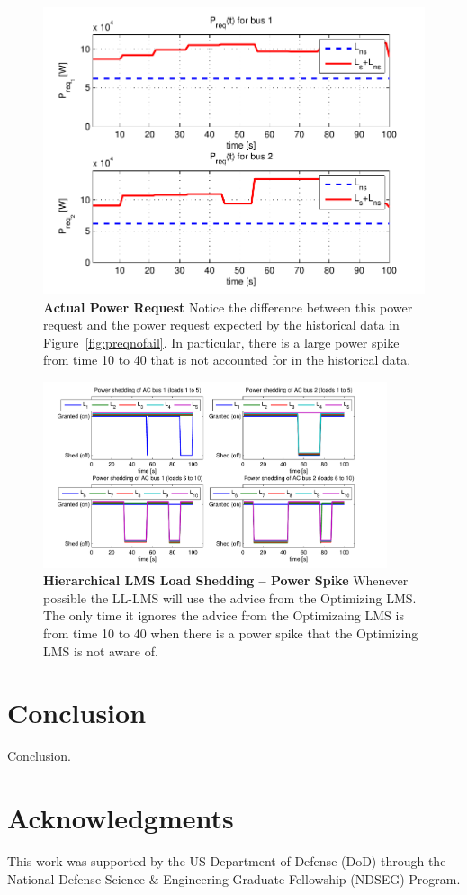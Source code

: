 \documentclass{acm_proc_article-sp}
\begin{document}
\begin{figure}[htb]
  \centering
  \includegraphics[width=0.9\columnwidth]{figures/preqpwrspike}
  \caption{\textbf{Actual Power Request} Notice the difference between this power
  request and the power request expected by the historical data in 
  Figure~\ref{fig:preqnofail}. In particular, there is a large power spike from time 10
  to 40 that is not accounted for in the historical data.}
  \label{fig:preqpwrspike}
\end{figure}
\begin{figure}[hp]
  \centering
  \includegraphics[width=0.9\textwidth]{figures/lsolpwrspike}
  \caption{\textbf{Hierarchical LMS Load Shedding -- Power Spike} Whenever possible the LL-LMS will
  use the advice from the Optimizing LMS. The only time it ignores the advice from the Optimizaing LMS is
  from time 10 to 40 when there is a power spike that the Optimizing LMS is not aware of.}
  \label{fig:lsolpwrspike}
\end{figure}

\section{Conclusion}
Conclusion.

\section*{Acknowledgments}
This work was supported by the US Department of Defense (DoD) through the National Defense Science \& Engineering Graduate Fellowship (NDSEG) Program.


 
\end{document}
